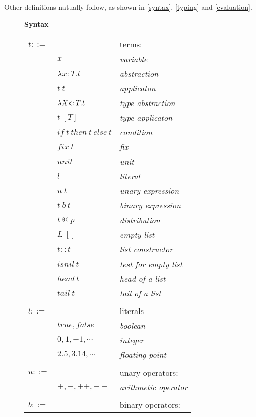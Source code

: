 \documentclass{report}
\makeatletter
\newcommand{\at}{~\texttt{@}~}
\newcommand{\subty}{\texttt{{\raisebox{-.7pt}{<}:}}}
\newcommand{\ty}{{:}}
\makeatother
\begin{document}
Other definitions natually follow, as shown in \ref{syntax}, \ref{typing} and \ref{evaluation}.

\begin{figure}
  \centering
  \begin{multicols}{2}
    \textbf{Syntax}\hfill\mbox{}
    \begin{tabular}{L{1cm}L{2.5cm}R{3cm}}
      $t ::=$ &  & terms: \\
      & $x$ & \textit{variable} \\
      & $\lambda x\ty T.t$ & \textit{abstraction} \\
      & $t~t$ & \textit{applicaton} \\
      & $\lambda X\subty T.t$ & \textit{type abstraction} \\
      & $t~[T]$ & \textit{type applicaton} \\
      & $if~t~then~t~else~t$ & \textit{condition} \\
      & $fix~t$ & \textit{fix} \\
      & $unit$ & \textit{unit} \\
      & $l$ & \textit{literal} \\
      & $u~t$ & \textit{unary expression} \\
      & $t~b~t$ & \textit{binary expression} \\
      & $t\at p$ & \textit{distribution} \\
      & $L~[]$ & \textit{empty list} \\
      & $t :: t$ & \textit{list constructor} \\
      & $isnil~t$ & \textit{test for empty list} \\
      & $head~t$ & \textit{head of a list} \\
      & $tail~t$ & \textit{tail of a list} \\
      & & \\
      $l ::=$ & & literals \\
      & $true, false$ & \textit{boolean} \\
      & $0, 1, -1, \cdots$ & \textit{integer} \\
      & $2.5, 3.14, \cdots$ & \textit{floating point} \\
      & & \\
      $u ::=$ & & unary operators: \\
      & $+, -, ++, --$ & \textit{arithmetic operator} \\
      & & \\
      $b ::=$ & & binary operators: \\

\end{tabular}
\end{multicols}
\end{figure}
\end{document}
